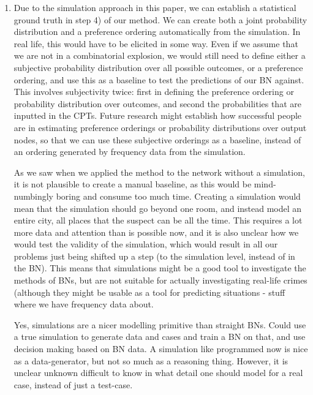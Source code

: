 \documentclass[12pt]{article}
\begin{document}
\begin{enumerate}

\item Due to the simulation approach in this paper, we can establish a statistical ground truth in step 4) of our method. We can create both a joint probability distribution and a preference ordering automatically from the simulation. In real life, this would have to be elicited in some way. Even if we assume that we are not in a combinatorial explosion, we would still need to define either a subjective probability distribution over all possible outcomes, or a preference ordering, and use this as a baseline to test the predictions of our BN against. This involves subjectivity twice: first in defining the preference ordering or probability distribution over outcomes, and second the probabilities that are inputted in the CPTs. Future research might establish how successful people are in estimating preference orderings or probability distributions over output nodes, so that we can use these subjective orderings as a baseline, instead of an ordering generated by frequency data from the simulation.

As we saw when we applied the method to the network without a simulation, it is not plausible to create a manual baseline, as this would be mind-numbingly boring and consume too much time.  Creating a simulation would mean that the simulation should go beyond one room, and instead model an entire city, all places that the suspect can be all the time. This requires a lot more data and attention than is possible now, and it is also unclear how we would test the validity of the simulation, which would result in all our problems just being shifted up a step (to the simulation level, instead of in the BN). This means that simulations might be a good tool to investigate the methods of BNs, but are not suitable for actually investigating real-life crimes (although they might be usable as a tool for predicting situations - stuff where we have frequency data about.

Yes, simulations are a nicer modelling primitive than straight BNs. Could use a true simulation to generate data and cases and train a BN on that, and use decision making based on BN data. A simulation like programmed now is nice as a data-generator, but not so much as a reasoning thing. However, it is unclear unknown difficult to know in what detail one should model for a real case, instead of just a test-case.


\end{enumerate}
\end{document}
